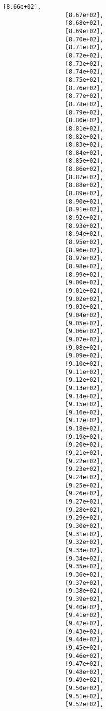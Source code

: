 \documentclass[11pt]{article}
\begin{document}
\begin{Verbatim}[commandchars=\\\{\}]
                  [8.66e+02],
                  [8.67e+02],
                  [8.68e+02],
                  [8.69e+02],
                  [8.70e+02],
                  [8.71e+02],
                  [8.72e+02],
                  [8.73e+02],
                  [8.74e+02],
                  [8.75e+02],
                  [8.76e+02],
                  [8.77e+02],
                  [8.78e+02],
                  [8.79e+02],
                  [8.80e+02],
                  [8.81e+02],
                  [8.82e+02],
                  [8.83e+02],
                  [8.84e+02],
                  [8.85e+02],
                  [8.86e+02],
                  [8.87e+02],
                  [8.88e+02],
                  [8.89e+02],
                  [8.90e+02],
                  [8.91e+02],
                  [8.92e+02],
                  [8.93e+02],
                  [8.94e+02],
                  [8.95e+02],
                  [8.96e+02],
                  [8.97e+02],
                  [8.98e+02],
                  [8.99e+02],
                  [9.00e+02],
                  [9.01e+02],
                  [9.02e+02],
                  [9.03e+02],
                  [9.04e+02],
                  [9.05e+02],
                  [9.06e+02],
                  [9.07e+02],
                  [9.08e+02],
                  [9.09e+02],
                  [9.10e+02],
                  [9.11e+02],
                  [9.12e+02],
                  [9.13e+02],
                  [9.14e+02],
                  [9.15e+02],
                  [9.16e+02],
                  [9.17e+02],
                  [9.18e+02],
                  [9.19e+02],
                  [9.20e+02],
                  [9.21e+02],
                  [9.22e+02],
                  [9.23e+02],
                  [9.24e+02],
                  [9.25e+02],
                  [9.26e+02],
                  [9.27e+02],
                  [9.28e+02],
                  [9.29e+02],
                  [9.30e+02],
                  [9.31e+02],
                  [9.32e+02],
                  [9.33e+02],
                  [9.34e+02],
                  [9.35e+02],
                  [9.36e+02],
                  [9.37e+02],
                  [9.38e+02],
                  [9.39e+02],
                  [9.40e+02],
                  [9.41e+02],
                  [9.42e+02],
                  [9.43e+02],
                  [9.44e+02],
                  [9.45e+02],
                  [9.46e+02],
                  [9.47e+02],
                  [9.48e+02],
                  [9.49e+02],
                  [9.50e+02],
                  [9.51e+02],
                  [9.52e+02],

\end{Verbatim}
\end{document}
